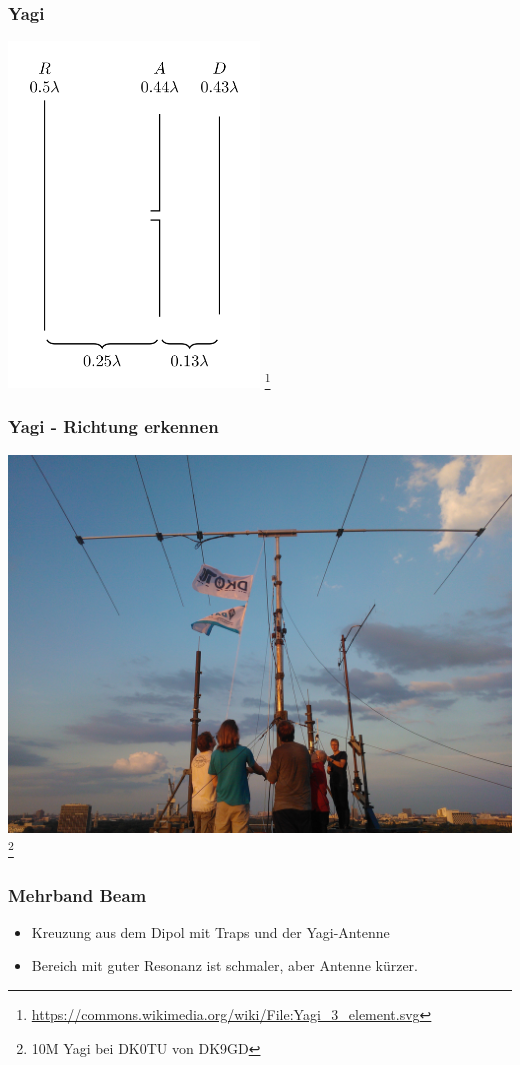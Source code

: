 \begin{frame}
    \frametitle{Yagi}
    \begin{center}
        \includegraphics[width=0.5\textwidth]{a09/Yagi_3_element.png}
        \footnote{\tiny \url{https://commons.wikimedia.org/wiki/File:Yagi_3_element.svg}}
	\end{center}
\end{frame}

\begin{frame}
    \frametitle{Yagi - Richtung erkennen}
    \begin{center}
        \includegraphics[width=.9\textwidth]{a09/yagi.jpg}
        \footnote{\tiny 10M Yagi bei DK0TU von DK9GD}
	\end{center}
\end{frame}

\begin{frame}
    \frametitle{Mehrband Beam}
    \begin{center} \large
        \begin{itemize}
		\item Kreuzung aus dem Dipol mit Traps und der Yagi-Antenne
        \item Bereich mit guter Resonanz ist schmaler, aber Antenne kürzer.
    	\end{itemize}
    \end{center}
\end{frame}

